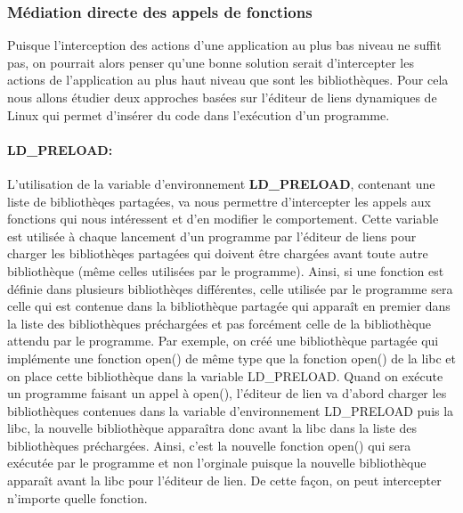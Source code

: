 \subsubsection{Médiation directe des appels de fonctions}

Puisque l'interception des actions d'une application au plus bas niveau ne
suffit pas, on pourrait alors penser qu'une bonne solution serait d'intercepter
les actions de l'application au plus haut niveau que sont les
bibliothèques. Pour cela nous allons étudier deux approches basées sur l'éditeur
de liens dynamiques de Linux qui permet d'insérer du code dans l'exécution
d'un programme.

\paragraph{LD\_PRELOAD:}

L'utilisation de la variable d'environnement
\textbf{LD\_PRELOAD}\citet{INTERCEPTION:LD_PRELOAD}, contenant une liste de
bibliothèqes partagées, va nous permettre d'intercepter les appels aux fonctions
qui nous intéressent et d'en modifier le comportement. Cette variable est
utilisée à chaque lancement d'un programme par l'éditeur de liens pour charger
les bibliothèqes partagées qui doivent être chargées avant toute autre
bibliothèque (même celles utilisées par le programme). Ainsi, si une fonction
est définie dans plusieurs bibliothèqes différentes, celle utilisée par le
programme sera celle qui est contenue dans la bibliothèque partagée qui apparaît
en premier dans la liste des bibliothèques préchargées et pas forcément celle de
la bibliothèque attendu par le programme. Par exemple, on créé une bibliothèque
partagée qui implémente une fonction open() de même type que la fonction open()
de la libc et on place cette bibliothèque dans la variable LD\_PRELOAD. Quand on
exécute un programme faisant un appel à open(), l'éditeur de lien va d'abord
charger les bibliothèques contenues dans la variable d'environnement LD\_PRELOAD
puis la libc, la nouvelle bibliothèque apparaîtra donc avant la libc dans la
liste des bibliothèques préchargées. Ainsi, c'est la nouvelle fonction open()
qui sera exécutée par le programme et non l'orginale puisque la nouvelle
bibliothèque apparaît avant la libc pour l'éditeur de lien. De cette façon, on
peut intercepter n'importe quelle fonction.

